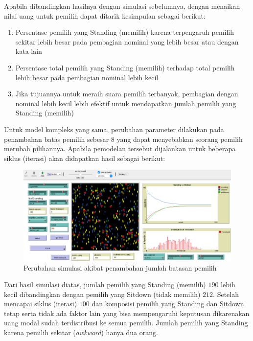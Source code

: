 Apabila dibandingkan hasilnya dengan simulasi sebelumnya, dengan menaikan nilai uang untuk pemilih dapat ditarik kesimpulan sebagai berikut:

\begin{enumerate}
\item Persentase pemilih yang Standing (memilih) karena terpengaruh pemilih sekitar lebih besar pada pembagian nominal yang lebih besar atau dengan kata lain

\item Persentase total pemilih yang Standing (memilih) terhadap total pemilih lebih besar pada pembagian nominal lebih kecil

\item Jika tujuannya untuk meraih suara pemilih terbanyak, pembagian dengan nominal lebih kecil lebih efektif untuk mendapatkan jumlah pemilih yang Standing (memilih)
\end{enumerate}

Untuk model kompleks yang sama, perubahan parameter dilakukan pada penambahan batas pemilih sebesar $8$ yang dapat menyebabkan seorang pemilih merubah pilihannya. Apabila pemodelan tersebut dijalankan untuk beberapa siklus (iterasi) akan didapatkan hasil sebagai berikut:

\begin{figure}[H]
\centering
\includegraphics[width=\linewidth]{images/ch03/pemilusop11}
\caption{Perubahan simulasi akibat penambahan jumlah batasan pemilih}
\label{fig:pemilusop11}
\end{figure}

Dari hasil simulasi diatas, jumlah pemilih yang Standing (memilih) $190$ lebih kecil dibandingkan dengan pemilih yang Sitdown (tidak memilih) $212$. Setelah mencapai siklus (iterasi) $100$ dan komposisi pemilih yang Standing dan Sitdown tetap serta tidak ada faktor lain yang bisa mempengaruhi keputusan dikarenakan uang modal sudah terdistribusi ke semua pemilih. Jumlah pemilih yang Standing karena pemilih sekitar (\textit{awkward}) hanya dua orang.

